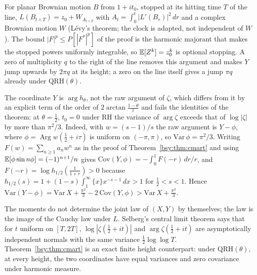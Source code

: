 \begin{remark}
For planar Brownian motion $B$ from $1+it_0$, stopped at its hitting time $T$ of the line, $L(B_{t\wedge T})=z_0+W_{A_{t\wedge T}}$ with $A_t=\int_0^t|L'(B_r)|^2\,dr$ and a complex Brownian motion $W$ (L\'evy's theorem; the clock is adapted, not independent of $W$). The bound $|F|^p\le P[|F^*|^p]$ of the proof is the harmonic majorant that makes the stopped powers uniformly integrable, so $\mathbb{E}[Z^k]=z_0^k$ is optional stopping. A zero of multiplicity $q$ to the right of the line removes this argument and makes $Y$ jump upwards by $2\pi q$ at its height; a zero on the line itself gives a jump $\pi q$ already under $\mathrm{QRH}(\theta)$.
\end{remark}

The coordinate $Y$ is $\arg h_\theta$, not the raw argument of $\zeta$, which differs from it by an explicit term of the order of $2\arctan\frac{1-\theta}t$ and fails the identities of the theorem: at $\theta=\frac12$, $t_0=0$ under RH the variance of $\arg\zeta$ exceeds that of $\log|\zeta|$ by more than $\pi^2/3$. Indeed, with $w=(s-1)/s$ the raw argument is $Y-\phi$, where $\phi=\operatorname{Arg}w(\frac12+i\tau)$ is uniform on $(-\pi,\pi)$, so $\mathrm{Var}\,\phi=\pi^2/3$. Writing $F(w)=\sum_{n\ge1}a_nw^n$ as in the proof of Theorem~\ref{bsy:thm:cmart} and using $\mathbb{E}[\phi\sin n\phi]=(-1)^{n+1}/n$ gives $\mathrm{Cov}(Y,\phi)=-\int_0^1F(-r)\,dr/r$, and $F(-r)=\log h_{1/2}(\frac1{1+r})>0$ because $h_{1/2}(s)=1+(1-s)\int_1^\infty\{x\}x^{-s-1}\,dx>1$ for $\frac12<s<1$. Hence $\mathrm{Var}(Y-\phi)=\mathrm{Var}\,X+\frac{\pi^2}3-2\,\mathrm{Cov}(Y,\phi)>\mathrm{Var}\,X+\frac{\pi^2}3$.

The moments do not determine the joint law of $(X,Y)$ by themselves; the law is the image of the Cauchy law under $L$. Selberg's central limit theorem says that for $t$ uniform on $[T,2T]$, $\log|\zeta(\frac12+it)|$ and $\arg\zeta(\frac12+it)$ are asymptotically independent normals with the same variance $\frac12\log\log T$. Theorem~\ref{bsy:thm:cmart} is an exact finite height counterpart: under $\mathrm{QRH}(\theta)$, at every height, the two coordinates have equal variances and zero covariance under harmonic measure.

